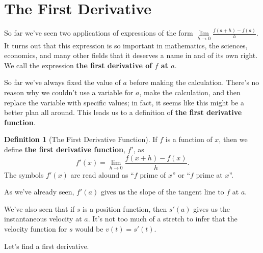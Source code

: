 \documentclass[10pt,oneside,]{book}
\newcommand{\terminology}[1]{\textbf{#1}}
\theoremstyle{plain}
\theoremstyle{definition}
\newtheorem{definition}[theorem]{Definition}
\numberwithin{equation}{section}
\newcommand{\fe}[2]{#1\mathopen{}\left(#2\right)\mathclose{}}
\newcommand{\fd}[1]{#1'}
\begin{document}
\section[The First Derivative]{The First Derivative}\label{section-first-derivative}
So far we've seen two applications of expressions of the form \(\lim\limits_{h\to0}\frac{\fe{f}{a+h}-\fe{f}{a}}{h}\). It turns out that this expression is so important in mathematics, the sciences, economics, and many other fields that it deserves a name in and of its own right. We call the expression \terminology{the first derivative of \(f\) at \(a\)}.%
\par
So far we've always fixed the value of \(a\) before making the calculation. There's no reason why we couldn't use a variable for \(a\), make the calculation, and then replace the variable with specific values; in fact, it seems like this might be a better plan all around. This leads us to a definition of \terminology{the first derivative function}.%
\begin{definition}[The First Derivative Function]\label{definition-first-derivative}
If \(f\) is a function of \(x\), then we define \terminology{the first derivative function}, \(\fd{f}\), as \[\fe{\fd{f}}{x}=\lim_{h\to0}\frac{\fe{f}{x+h}-\fe{f}{x}}{h}\text{.}\] The symbols \(\fe{\fd{f}}{x}\) are read alound as ``\(f\) prime of \(x\)'' or ``\(f\) prime at \(x\)''.%
\end{definition}
\par
As we've already seen, \(\fe{\fd{f}}{a}\) gives us the slope of the tangent line to \(f\) at \(a\).%
\par
We've also seen that if \(s\) is a position function, then \(\fe{\fd{s}}{a}\) gives us the instantaneous velocity at \(a\). It's not too much of a stretch to infer that the velocity function for \(s\) would be \(\fe{v}{t}=\fe{\fd{s}}{t}\).%
\par
Let's find a first derivative.%
\end{document}

